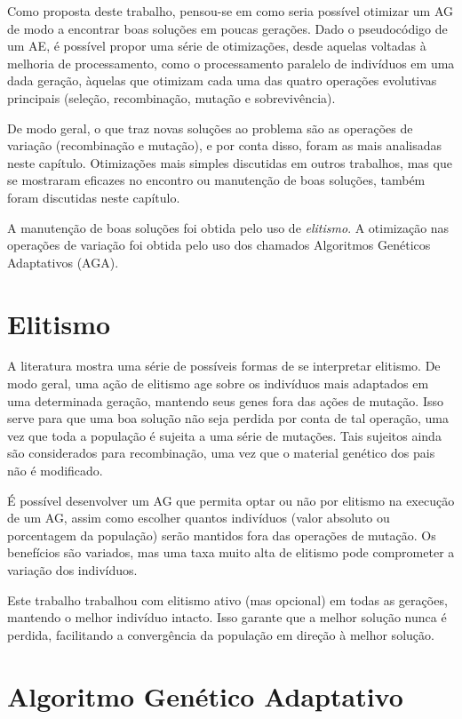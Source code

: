 \label{4_otimizacao}

Como proposta deste trabalho, pensou-se em como seria possível otimizar um AG de modo a encontrar boas soluções em poucas gerações. Dado o pseudocódigo de um AE, é possível propor uma série de otimizações, desde aquelas voltadas à melhoria de processamento, como o processamento paralelo de indivíduos em uma dada geração, àquelas que otimizam cada uma das quatro operações evolutivas principais (seleção, recombinação, mutação e sobrevivência).

De modo geral, o que traz novas soluções ao problema são as operações de variação (recombinação e mutação), e por conta disso, foram as mais analisadas neste capítulo. Otimizações mais simples discutidas em outros trabalhos, mas que se mostraram eficazes no encontro ou manutenção de boas soluções, também foram discutidas neste capítulo.

A manutenção de boas soluções foi obtida pelo uso de \emph{elitismo}. A otimização nas operações de variação foi obtida pelo uso dos chamados Algoritmos Genéticos Adaptativos (AGA).

\section{Elitismo}

A literatura mostra uma série de possíveis formas de se interpretar elitismo. De modo geral, uma ação de elitismo age sobre os indivíduos mais adaptados em uma determinada geração, mantendo seus genes fora das ações de mutação. Isso serve para que uma boa solução não seja perdida por conta de tal operação, uma vez que toda a população é sujeita a uma série de mutações. Tais sujeitos ainda são considerados para recombinação, uma vez que o material genético dos pais não é modificado.

É possível desenvolver um AG que permita optar ou não por elitismo na execução de um AG, assim como escolher quantos indivíduos (valor absoluto ou porcentagem da população) serão mantidos fora das operações de mutação. Os benefícios são variados, mas uma taxa muito alta de elitismo pode comprometer a variação dos indivíduos.

Este trabalho trabalhou com elitismo ativo (mas opcional) em todas as gerações, mantendo o melhor indivíduo intacto. Isso garante que a melhor solução nunca é perdida, facilitando a convergência da população em direção à melhor solução.

\section{Algoritmo Genético Adaptativo}

